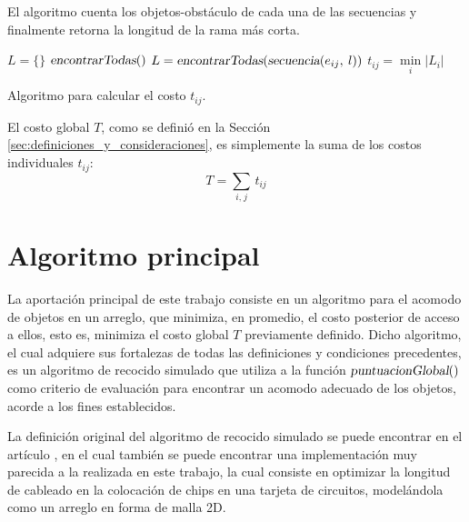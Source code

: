El algoritmo cuenta los objetos-obstáculo de cada una de las secuencias y finalmente retorna la longitud de la rama más corta.
%
\begin{center}
\begin{minipage}{0.98\textwidth}
\begin{algorithm}[H]
	\OneHalfBlankLine
	\TwoBlankLines
	$L = \{ \}$\;
	\TwoBlankLines
	$\textsl{encontrarTodas}()$\;
	\TwoBlankLines
	$L = \textsl{encontrarTodas}(\textsl{secuencia}(e_{ij},\: l))$\;
	\TwoBlankLines
	$t_{ij} = \min\limits_i \left| L_i \right|$\;
	\HalfBlankLine
	\caption{Algoritmo para calcular el costo $t_{ij}$.}%
	\label{alg:costo_individual}%
\end{algorithm}
\end{minipage}
\end{center}
%
El costo global $T$, como se definió en la Sección \ref{sec:definiciones_y_consideraciones}, es simplemente la suma de los costos individuales $t_{ij}$:
%
\begin{equation}
T = \sum_{i,\hspace{1pt} j} \, t_{ij}
\end{equation}

\vspace{-\belowdisplayskip}%
%
%
\section{Algoritmo principal}
\label{sec:algoritmo_principal}
%
%
La aportación principal de este trabajo consiste en un algoritmo para el acomodo de objetos en un arreglo, que minimiza, en promedio, el costo posterior de acceso a ellos, esto es, minimiza el costo global $T$ previamente definido.
Dicho algoritmo, el cual adquiere sus fortalezas de todas las definiciones y condiciones precedentes, es un algoritmo de recocido simulado que utiliza a la función $\textsl{puntuacionGlobal}()$ como criterio de evaluación para encontrar un acomodo adecuado de los objetos, acorde a los fines establecidos.

La definición original del algoritmo de recocido simulado se puede encontrar en el artículo \cite{doi:10.1126/science.220.4598.671}, en el cual también se puede encontrar una implementación muy parecida a la realizada en este trabajo, la cual consiste en optimizar la longitud de cableado en la colocación de chips en una tarjeta de circuitos, modelándola como un arreglo en forma de malla 2D.

